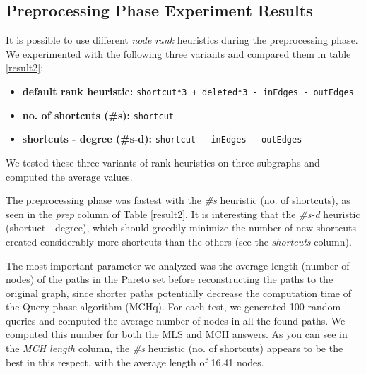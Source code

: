 \subsection{Preprocessing Phase Experiment Results}

It is possible to use different {\em node rank} heuristics during the
preprocessing phase. We experimented with the following three variants 
and compared them in table \ref{result2}:

\begin{itemize}
    \item {\bf default rank heuristic:} {\tt shortcut*3 + deleted*3 -~inEdges -~outEdges} 
    \item {\bf no. of shortcuts (\#s):} {\tt shortcut} 
    \item {\bf shortcuts - degree (\#s-d):} {\tt shortcut -~inEdges -~outEdges} 
\end{itemize}

We tested these three variants of rank heuristics on three 
subgraphs and computed the average values.

The preprocessing phase was fastest with the {\em \#s} heuristic (no. of shortcuts), as seen in the {\em prep} column of Table \ref{result2}. 
It is interesting that the {\em \#s-d} heuristic (shortuct - degree), which should greedily 
minimize the number of new shortcuts created considerably more shortcuts than the others (see the {\em shortcuts} column).

The most important parameter we analyzed was the average length (number of nodes) of 
the paths in the Pareto set before reconstructing the paths to the original graph, 
since shorter paths potentially decrease the computation time of the Query phase algorithm (MCHq).
For each test, we generated 100 random queries and computed the average number of nodes 
in all the found paths. We computed this number for both the MLS and MCH answers. As you can see 
in the {\em MCH length} column, the {\em \#s} heuristic (no. of shortcuts) appears to 
be the best in this respect, with the average length of 16.41 nodes.  

